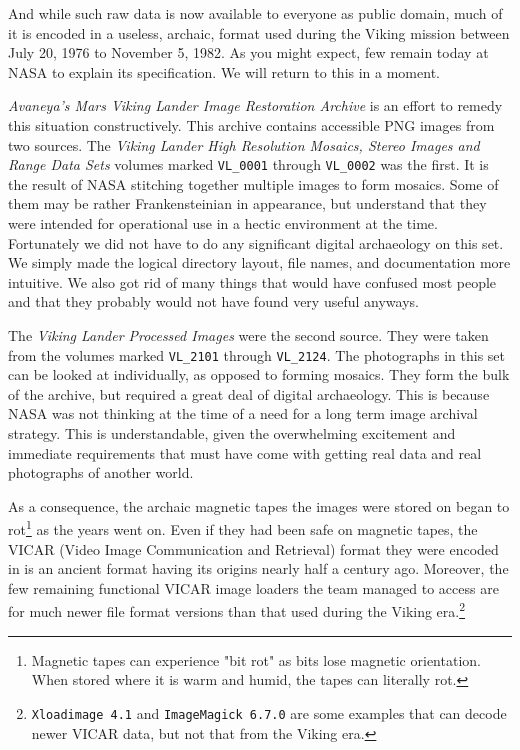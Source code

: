 And while such raw data is now available to everyone as public domain, much of it is encoded in a useless, archaic, format used during the Viking mission between July 20, 1976 to November 5, 1982. As you might expect, few remain today at NASA to explain its specification. We will return to this in a moment.

{\it Avaneya's Mars Viking Lander Image Restoration Archive} is an effort to remedy this situation constructively. This archive contains accessible PNG images from two sources. The {\it Viking Lander High Resolution Mosaics, Stereo Images and Range Data Sets} volumes marked {\tt VL_0001} through {\tt VL_0002} was the first. It is the result of NASA stitching together multiple images to form mosaics. Some of them may be rather Frankensteinian in appearance, but understand that they were intended for operational use in a hectic environment at the time. Fortunately we did not have to do any significant digital archaeology on this set. We simply made the logical directory layout, file names, and documentation more intuitive. We also got rid of many things that would have confused most people and that they probably would not have found very useful anyways.

The {\it Viking Lander Processed Images} were the second source. They were taken from the volumes marked {\tt VL_2101} through {\tt VL_2124}. The photographs in this set can be looked at individually, as opposed to forming mosaics. They form the bulk of the archive, but required a great deal of digital archaeology. This is because NASA was not thinking at the time of a need for a long term image archival strategy. This is understandable, given the overwhelming excitement and immediate requirements that must have come with getting real data and real photographs of another world.

    {}

As a consequence, the archaic magnetic tapes the images were stored on began to rot\footnote{Magnetic tapes can experience "bit rot" as bits lose magnetic orientation. When stored where it is warm and humid, the tapes can literally rot.} as the years went on. Even if they had been safe on magnetic tapes, the VICAR (Video Image Communication and Retrieval) format they were encoded in is an ancient format having its origins nearly half a century ago. Moreover, the few remaining functional VICAR image loaders the team managed to access are for much newer file format versions than that used during the Viking era.\footnote{{\tt Xloadimage 4.1} and {\tt ImageMagick 6.7.0} are some examples that can decode newer VICAR data, but not that from the Viking era.}

